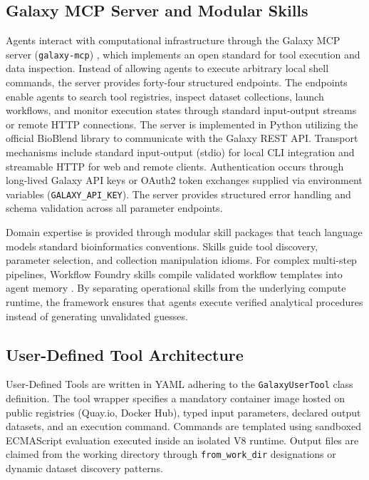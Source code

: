 \documentclass[11pt,letterpaper]{article}
\begin{document}
\subsection*{Galaxy MCP Server and Modular Skills}
Agents interact with computational infrastructure through the Galaxy MCP server (\texttt{galaxy-mcp}) \cite{galaxymcp2026}, which implements an open standard for tool execution and data inspection. Instead of allowing agents to execute arbitrary local shell commands, the server provides forty-four structured endpoints. The endpoints enable agents to search tool registries, inspect dataset collections, launch workflows, and monitor execution states through standard input-output streams or remote HTTP connections. The server is implemented in Python utilizing the official BioBlend library to communicate with the Galaxy REST API. Transport mechanisms include standard input-output (stdio) for local CLI integration and streamable HTTP for web and remote clients. Authentication occurs through long-lived Galaxy API keys or OAuth2 token exchanges supplied via environment variables (\texttt{GALAXY\_API\_KEY}). The server provides structured error handling and schema validation across all parameter endpoints.

Domain expertise is provided through modular skill packages \cite{galaxyskills2026} that teach language models standard bioinformatics conventions. Skills guide tool discovery, parameter selection, and collection manipulation idioms. For complex multi-step pipelines, Workflow Foundry skills compile validated workflow templates into agent memory \cite{foundry2026}. By separating operational skills from the underlying compute runtime, the framework ensures that agents execute verified analytical procedures instead of generating unvalidated guesses.

\subsection*{User-Defined Tool Architecture}
User-Defined Tools are written in YAML adhering to the \texttt{GalaxyUserTool} class definition. The tool wrapper specifies a mandatory container image hosted on public registries (Quay.io, Docker Hub), typed input parameters, declared output datasets, and an execution command. Commands are templated using sandboxed ECMAScript evaluation executed inside an isolated V8 runtime. Output files are claimed from the working directory through \texttt{from\_work\_dir} designations or dynamic dataset discovery patterns.
\end{document}
